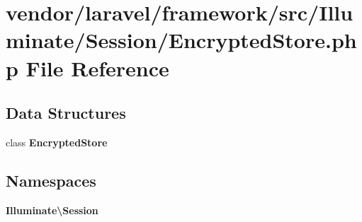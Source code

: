 \section{vendor/laravel/framework/src/\+Illuminate/\+Session/\+Encrypted\+Store.php File Reference}
\label{_encrypted_store_8php}
\subsection*{Data Structures}
\begin{DoxyCompactItemize}
\item 
class {\bf Encrypted\+Store}
\end{DoxyCompactItemize}
\subsection*{Namespaces}
\begin{DoxyCompactItemize}
\item 
 {\bf Illuminate\textbackslash{}\+Session}
\end{DoxyCompactItemize}
